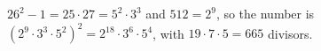 $26^2-1=25\cdot27=5^2\cdot3^3$ and $512=2^9$, so the number is $\left(2^9\cdot3^3\cdot5^2\right)^2=2^{18}\cdot3^6\cdot5^4$, with $19\cdot7\cdot5=\boxed{665}$ divisors.
